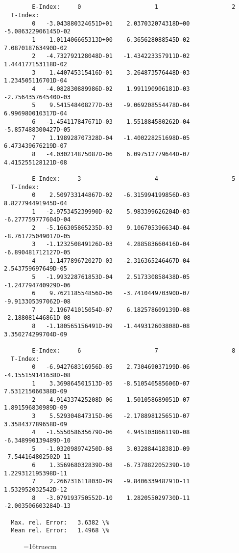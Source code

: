 \documentclass[12pt,dvipdfmx]{article}
\begin{document}
\begin{small}\begin{verbatim}


        E-Index:     0                     1                     2
  T-Index:
        0   -3.043880324651D+01    2.037032074318D+00   -5.086322906145D-02
        1    1.011406665313D+00   -6.365628088545D-02    7.087018763490D-02
        2   -4.732792128048D-01   -1.434223357911D-02    1.444177153118D-02
        3    1.440745315416D-01    3.264873576448D-03    1.234505116701D-04
        4   -4.082830889986D-02    1.991190906181D-03   -2.756435764540D-03
        5    9.541548408277D-03   -9.069208554478D-04    6.996980010317D-04
        6   -1.454117847671D-03    1.551884580262D-04   -5.857488300427D-05
        7    1.198928707328D-04   -1.400228251698D-05    6.473439676219D-07
        8   -4.030214875087D-06    6.097512779644D-07    4.415255128121D-08

        E-Index:     3                     4                     5
  T-Index:
        0    2.509733144867D-02   -6.315994199856D-03    8.827794491945D-04
        1   -2.975345239990D-02    5.983399626204D-03   -6.277759777604D-04
        2   -5.166305865235D-03    9.106705396634D-04   -8.761725049017D-05
        3   -1.123250849126D-03    4.288583660416D-04   -6.890481712127D-05
        4    1.147789672027D-03   -2.316365246467D-04    2.543759697649D-05
        5   -1.993228761853D-04    2.517330858438D-05   -1.247794740929D-06
        6    9.762118554856D-06   -3.741044970390D-07   -9.913305397062D-08
        7    2.196741015054D-07    6.182578609139D-08   -2.188081446861D-08
        8   -1.180565156491D-09   -1.449312603808D-08    3.350274299704D-09

        E-Index:     6                     7                     8
  T-Index:
        0   -6.942768316956D-05    2.730469037199D-06   -4.155159141638D-08
        1    3.369864501513D-05   -8.510546585606D-07    7.531215060388D-09
        2    4.914337425208D-06   -1.501058689051D-07    1.891596830989D-09
        3    5.529304847315D-06   -2.178898125651D-07    3.358437789658D-09
        4   -1.555058635679D-06    4.945103866119D-08   -6.348990139489D-10
        5   -1.032098974250D-08    3.032884418381D-09   -7.544164802502D-11
        6    1.356968032839D-08   -6.737882205239D-10    1.229312195398D-11
        7    2.266731611803D-09   -9.840633948791D-11    1.532952032542D-12
        8   -3.079193750552D-10    1.282055029730D-11   -2.003506603284D-13

  Max. rel. Error:   3.6382 \%
  Mean rel. Error:   1.4968 \%

\end{verbatim}\end{small}
\begin{figure} \label{7.2d}
\epsfxsize=16truecm
\end{figure}
\newpage
\end{document}
